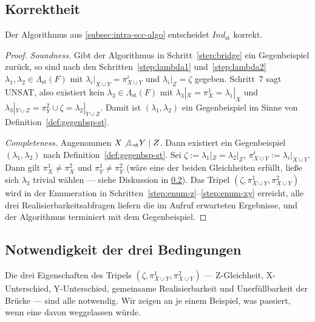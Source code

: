 \subsection{Korrektheit}
\label{subsec:intra-scc-correctness}

\begin{Lemma}
    \label{lem:algo-korrekt}
    Der Algorithmus aus \ref{subsec:intra-scc-algo} entscheidet
    \(\textit{Ind}_{\mathrm{st}}\) korrekt.
\end{Lemma}

\begin{proof}
    \emph{Soundness.} Gibt der Algorithmus in Schritt~\ref{step:bridge}
    ein Gegenbeispiel zurück, so sind nach den Schritten~\ref{step:lambda1}
    und~\ref{step:lambda2} \(\lambda_1, \lambda_2 \in
    \varLambda_{\mathrm{st}}(F)\) mit \(\lambda_i|_{X\cup Y} =
    \pi^i_{X\cup Y}\) und \(\lambda_i|_Z = \zeta\) gegeben. Schritt~7
    sagt UNSAT, also existiert kein \(\lambda_3 \in
    \varLambda_{\mathrm{st}}(F)\) mit \(\lambda_3|_X = \pi^1_X =
    \lambda_1|_X\) und \(\lambda_3|_{Y\cup Z} = \pi^2_Y \cup \zeta =
    \lambda_2|_{Y\cup Z}\). Damit ist \((\lambda_1, \lambda_2)\) ein
    Gegenbeispiel im Sinne von Definition~\ref{def:gegenbsp-st}.

    \emph{Completeness.} Angenommen \(X \not\bot_{\mathrm{st}} Y \mid Z\).
    Dann existiert ein Gegenbeispiel \((\lambda_1, \lambda_2)\) nach
    Definition~\ref{def:gegenbsp-st}. Sei
    \(\zeta := \lambda_1|_Z = \lambda_2|_Z\),
    \(\pi^i_{X\cup Y} := \lambda_i|_{X\cup Y}\). Dann gilt
    \(\pi^1_X \neq \pi^2_X\) und \(\pi^1_Y \neq \pi^2_Y\) (wäre eine der
    beiden Gleichheiten erfüllt, ließe sich \(\lambda_3\) trivial wählen
    --- siehe Diskussion in \ref{subsec:intra-scc-invariants-discussion}).
    Das Tripel \((\zeta, \pi^1_{X\cup Y}, \pi^2_{X\cup Y})\) wird in der
    Enumeration in Schritten~\ref{step:enum-z}--\ref{step:enum-xy}
    erreicht, alle drei Realisierbarkeitsabfragen liefern die im Aufruf
    erwarteten Ergebnisse, und der Algorithmus terminiert mit dem
    Gegenbeispiel.
\end{proof}

\subsection{Notwendigkeit der drei Bedingungen}
\label{subsec:intra-scc-invariants-discussion}

Die drei Eigenschaften des Tripels \((\zeta, \pi^1_{X\cup Y},
\pi^2_{X\cup Y})\) --- Z-Gleichheit, X-Unterschied, Y-Unterschied,
gemeinsame Realisierbarkeit und Unerfüllbarkeit der Brücke --- sind alle
notwendig. Wir zeigen an je einem Beispiel, was passiert, wenn eine
davon weggelassen würde.

